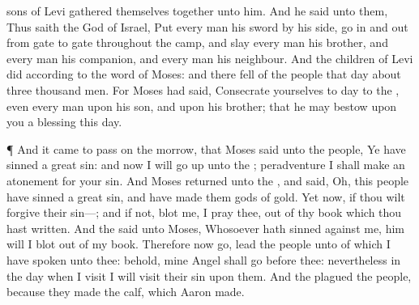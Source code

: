 {sons of
Levi
gathered themselves together unto him.
And he
said unto them, Thus
saith the
{}
God of
Israel,
Put every
man his
sword by his
side,
{}
go in and
out from
gate to
gate throughout the
camp, and
slay every
man his
brother, and every
man his
companion, and every
man his
neighbour.
And the
children of
Levi
did according to the
word of
Moses: and there
fell of the
people that
day about
three
thousand
men.
For
Moses had
said, Consecrate
yourselves to
day to the
{},
even every
man upon his
son, and upon his
brother; that he may
bestow upon you a
blessing this
day.
\par }{\PP {}¶ And it came to pass on the
morrow, that
Moses
said unto the
people, Ye have
sinned a
great
sin: and now I will go
up unto the
{};
peradventure I shall make an
atonement
for your
sin.
And
Moses
returned unto the
{}, and
said,
Oh, this
people have
sinned a
great
sin, and have
made them
gods of
gold.
Yet now, if thou wilt
forgive their
sin—; and if not,
blot me, I pray thee, out of thy
book which thou hast
written.
And the
{}
said unto
Moses,
Whosoever hath
sinned against me, him will I blot
out of my
book.
Therefore now
go,
lead the
people unto
{} of which I have
spoken unto thee: behold, mine
Angel shall
go
before thee: nevertheless in the
day when I
visit I will
visit their
sin upon them.
And the
{}
plagued the
people,
because they
made the
calf,
which
Aaron
made.

}
